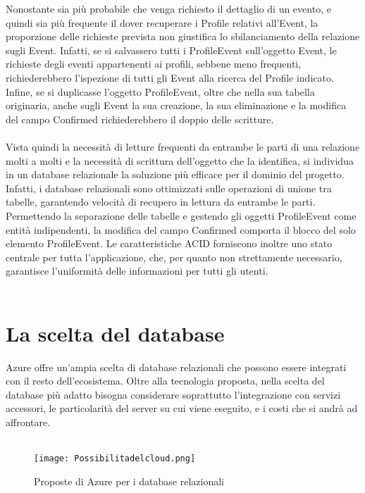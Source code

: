 Nonostante sia più probabile che venga richiesto il dettaglio di un evento, e quindi sia più frequente il dover recuperare i Profile relativi all’Event, 
la proporzione delle richieste prevista non giustifica lo sbilanciamento della relazione sugli Event.
Infatti, se si salvassero tutti i ProfileEvent sull’oggetto Event, le richieste degli eventi appartenenti ai profili, sebbene meno frequenti, 
richiederebbero l’ispezione di tutti gli Event alla ricerca del Profile indicato. 
Infine, se si duplicasse l’oggetto ProfileEvent, oltre che nella sua tabella originaria, anche sugli Event la sua creazione, 
la sua eliminazione e la modifica del campo Confirmed richiederebbero il doppio delle scritture.\\
\\
Vista quindi la necessità di letture frequenti da entrambe le parti di una relazione molti a molti e la necessità di scrittura dell’oggetto che la identifica, 
si individua in un database relazionale la soluzione più efficace per il dominio del progetto. 
Infatti, i database relazionali sono ottimizzati sulle operazioni di unione tra tabelle, garantendo velocità di recupero in lettura da entrambe le parti. 
Permettendo la separazione delle tabelle e gestendo gli oggetti ProfileEvent come entità indipendenti, 
la modifica del campo Confirmed comporta il blocco del solo elemento ProfileEvent. 
Le caratteristiche ACID forniscono inoltre uno stato centrale per tutta l’applicazione, che, 
per quanto non strettamente necessario, garantisce l’uniformità delle informazioni per tutti gli utenti.\\
\\

\clearpage
\section{La scelta del database}

Azure offre un’ampia scelta di database relazionali che possono essere integrati con il resto dell’ecosistema. 
Oltre alla tecnologia proposta, nella scelta del database più adatto bisogna considerare soprattutto l’integrazione con servizi accessori, 
le particolarità del server su cui viene eseguito, e i costi che si andrà ad affrontare.\\
\\
\begin{figure}[h!]
    \centering
    \texttt{[image: Possibilitadelcloud.png]}
    \caption{Proposte di Azure per i database relazionali}
\end{figure}	


